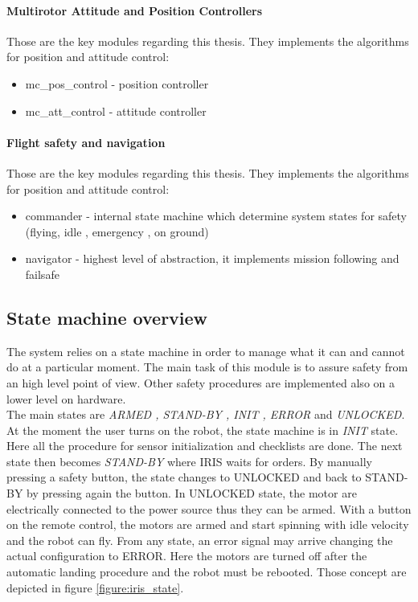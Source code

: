 \paragraph{Multirotor Attitude and Position Controllers} Those are the key modules regarding this thesis. They implements the algorithms for position and attitude control:
\begin{itemize}
	\item mc\_pos\_control - position controller
	\item mc\_att\_control - attitude controller
\end{itemize}

\paragraph{Flight safety and navigation} Those are the key modules regarding this thesis. They implements the algorithms for position and attitude control:
\begin{itemize}
	\item commander - internal state machine which determine system states for safety (flying, idle , emergency , on ground)
	\item navigator - highest level of abstraction, it implements mission following and failsafe
\end{itemize}

\subsection{State machine overview}

The system relies on a state machine in order to manage what it can and cannot do at a particular moment. The main task of this module is to assure safety from an high level point of view. Other safety procedures are implemented also on a lower level on hardware. \\

\noindent
The main states are \textit{ARMED , STAND-BY , INIT , ERROR} and \textit{UNLOCKED}. At the moment the user turns on the robot, the state machine is in \textit{INIT} state. Here all the procedure for sensor initialization and checklists are done. The next state then becomes \textit{STAND-BY} where IRIS waits for orders. By manually pressing a safety button, the state changes to UNLOCKED and back to STAND-BY by pressing again the button. In UNLOCKED state, the motor are electrically connected to the power source thus they can be armed. With a button on the remote control, the motors are armed and start spinning with idle velocity and the robot can fly. From any state, an error signal may arrive changing the actual configuration to ERROR. Here the motors are turned off after the automatic landing procedure and the robot must be rebooted. Those concept are depicted in figure \ref{figure:iris_state}.

